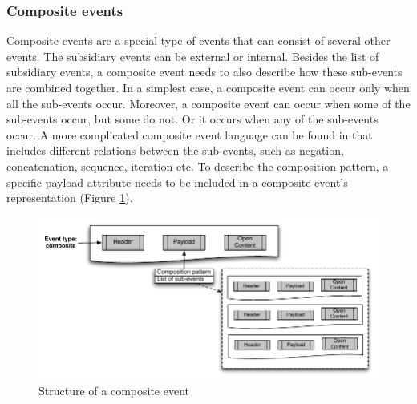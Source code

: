 \subsubsection{Composite events} %
\label{ssub:composite_events}
Composite events are a special type of events that can consist of several other events. The subsidiary events can be external or internal. Besides the list of subsidiary events, a composite event needs to also describe how these sub-events are combined together. In a simplest case, a composite event can occur only when all the sub-events occur. Moreover, a composite event can occur when some of the sub-events occur, but some do not. Or it occurs when any of the sub-events occur. A more complicated composite event language can be found in \cite{Mhl2010} that includes different relations between the sub-events, such as negation, concatenation, sequence, iteration etc. To describe the composition pattern, a specific payload attribute needs to be included in a composite event's representation (Figure \ref{fig:composite_event}).
\begin{figure}[htbp] %
	\centering
	\includegraphics{composite_event.pdf} 
	\caption{Structure of a composite event}
	\label{fig:composite_event}
\end{figure}

